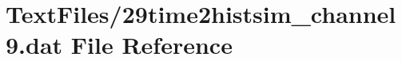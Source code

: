 \hypertarget{29time2histsim__channel9_8dat}{}\section{Text\+Files/29time2histsim\+\_\+channel9.dat File Reference}
\label{29time2histsim__channel9_8dat}
